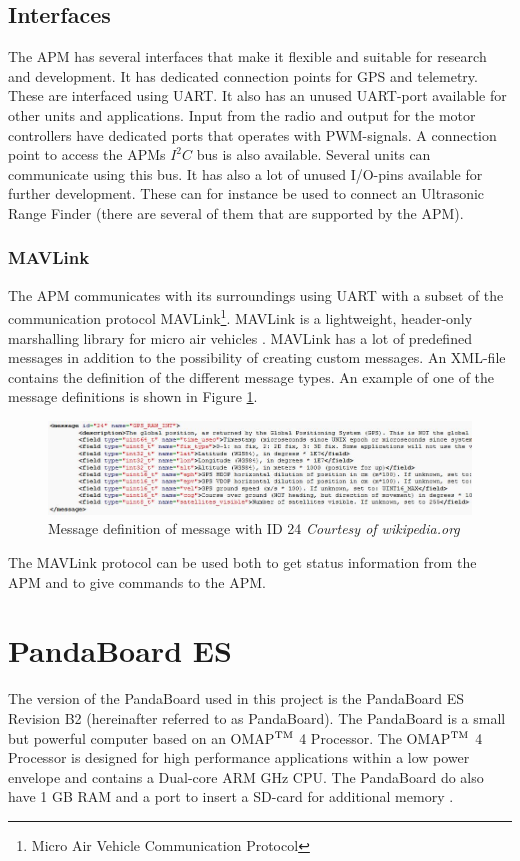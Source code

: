 \subsection{Interfaces}
The APM has several interfaces that make it flexible and suitable for research and development. It has dedicated connection points for GPS and telemetry. These are interfaced using UART. It also has an unused UART-port available for other units and applications. Input from the radio and output for the motor controllers have dedicated ports that operates with PWM-signals. A connection point to access the APMs $I^2C$ bus is also available. Several units can communicate using this bus. It has also a lot of unused I/O-pins available for further development. These can for instance be used to connect an Ultrasonic Range Finder (there are several of them that are supported by the APM).
\subsubsection{MAVLink}
The APM communicates with its surroundings using UART with a subset of the communication protocol MAVLink\footnote{Micro Air Vehicle Communication Protocol}. MAVLink is a lightweight, header-only marshalling library for micro air vehicles \citep{mavlink}. MAVLink has a lot of predefined messages in addition to the possibility of creating custom messages. An XML-file contains the definition of the different message types. An example of one of the message definitions is shown in Figure \ref{mavlink}.
\begin{figure}[H]
\centering
\includegraphics[width = 16cm]{fig/mavlink.JPG}
\caption{Message definition of message with ID 24 \textit{Courtesy of wikipedia.org}}
\label{mavlink}
\end{figure}\noindent
The MAVLink protocol can be used both to get status information from the APM and to give commands to the APM.
\section{PandaBoard ES}
The version of the PandaBoard used in this project is the PandaBoard ES Revision B2 (hereinafter referred to as PandaBoard). The PandaBoard is a small but powerful computer based on an OMAP$^{\rm TM}$ 4 Processor. The OMAP$^{\rm TM}$ 4 Processor is designed for high performance applications within a low power envelope \citep{omap} and contains a Dual-core ARM GHz CPU. The PandaBoard do also have 1 GB RAM and a port to insert a SD-card for additional memory \citep{panda}.
